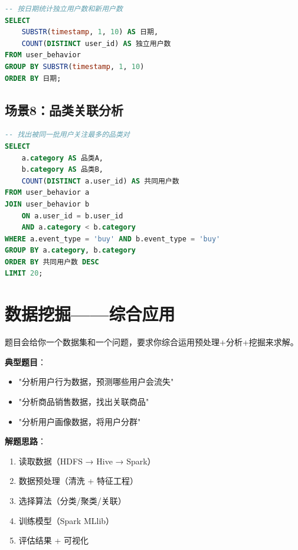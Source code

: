 \documentclass[12pt,a4paper]{article}
\begin{document}
\begin{lstlisting}[language=SQL]
-- 按日期统计独立用户数和新用户数
SELECT
    SUBSTR(timestamp, 1, 10) AS 日期,
    COUNT(DISTINCT user_id) AS 独立用户数
FROM user_behavior
GROUP BY SUBSTR(timestamp, 1, 10)
ORDER BY 日期;
\end{lstlisting}

\subsection{场景8：品类关联分析}

\begin{lstlisting}[language=SQL]
-- 找出被同一批用户关注最多的品类对
SELECT
    a.category AS 品类A,
    b.category AS 品类B,
    COUNT(DISTINCT a.user_id) AS 共同用户数
FROM user_behavior a
JOIN user_behavior b
    ON a.user_id = b.user_id
    AND a.category < b.category
WHERE a.event_type = 'buy' AND b.event_type = 'buy'
GROUP BY a.category, b.category
ORDER BY 共同用户数 DESC
LIMIT 20;
\end{lstlisting}

\section{数据挖掘——综合应用}

\begin{knowledgebox}[综合应用考什么？]
题目会给你一个数据集和一个问题，要求你综合运用预处理+分析+挖掘来求解。

\textbf{典型题目}：
\begin{itemize}
    \item "分析用户行为数据，预测哪些用户会流失"
    \item "分析商品销售数据，找出关联商品"
    \item "分析用户画像数据，将用户分群"
\end{itemize}

\textbf{解题思路}：
\begin{enumerate}
    \item 读取数据（HDFS → Hive → Spark）
    \item 数据预处理（清洗 + 特征工程）
    \item 选择算法（分类/聚类/关联）
    \item 训练模型（Spark MLlib）
    \item 评估结果 + 可视化
    
\end{enumerate}
\end{knowledgebox}
\end{document}
